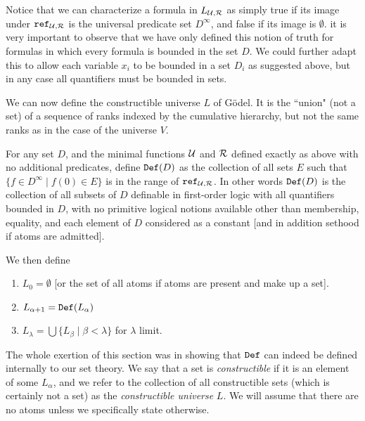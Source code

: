 \documentclass[12pt]{book}
\begin{document}
Notice that we can characterize a formula in $L_{\cal U,R}$ as simply true if its image under ${\tt ref}_{\cal U,R}$ is the universal predicate set $D^{\infty}$, and false if its image is $\emptyset$.  it is very important to observe that we have only defined this notion of truth for formulas in which every formula is bounded in the set $D$.  We could further adapt this to allow each variable $x_i$ to be bounded in a set $D_i$ as suggested above, but in any case all quantifiers must be bounded in sets.

We can now define the constructible universe $L$ of G\"odel.  It is the ``union" (not a set) of a sequence of ranks indexed by the cumulative hierarchy, but not the same ranks as in the case of the universe $V$.

For any set $D$, and the minimal functions ${\cal U}$ and ${\cal R}$ defined exactly as above with no additional predicates, define ${\tt Def}(D)$ as the collection of all sets
$E$ such that $\{f \in D^{\infty} \mid f(0) \in E\}$ is in the range of ${\tt ref}_{\cal U,\cal R}$.  In other words ${\tt Def}(D)$ is the collection of all subsets of $D$ definable
in first-order logic with all quantifiers bounded in $D$, with no primitive logical notions available other than membership, equality, and each element of $D$ considered as a constant [and in addition sethood if atoms are admitted].

We then define

\begin{enumerate}

\item $L_0 = \emptyset$ [or the set of all atoms if atoms are present and make up a set].

\item $L_{\alpha+1} = {\tt Def}(L_{\alpha})$

\item $L_{\lambda}= \bigcup\{L_{\beta} \mid \beta<\lambda\}$ for $\lambda$ limit.

\end{enumerate}

The whole exertion of this section was in showing that ${\tt Def}$ can indeed be defined internally to our set theory.  We say that a set is {\em constructible} if it is an element of some $L_{\alpha}$, and we refer to the collection of all constructible sets (which is certainly not a set) as the {\em constructible universe\/} $L$.   We will assume that there are no atoms unless we specifically state otherwise.
\end{document}
